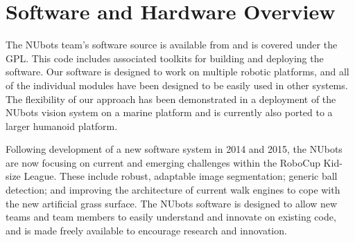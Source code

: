 \documentclass{llncs}
\begin{document}
\section{Software and Hardware Overview}
The NUbots team's software source is available from \cite{nubotsGit} and is covered under the GPL. This code includes associated toolkits for building and deploying the software. Our software is designed to work on multiple robotic platforms, and all of the individual modules have been designed to be easily used in other systems. The flexibility of our approach has been demonstrated in a deployment of the NUbots vision system on a marine platform and is currently also ported to a larger humanoid platform.%

Following development of a new software system in 2014 and 2015, the NUbots are now focusing on current and emerging challenges within the RoboCup Kid-size League. These include robust, adaptable image segmentation; generic ball detection; and improving the architecture of current walk engines to cope with the new artificial grass surface. The NUbots software is designed to allow new teams and team members to easily understand and innovate on existing code, and is made freely available to encourage research and innovation.



\end{document}
